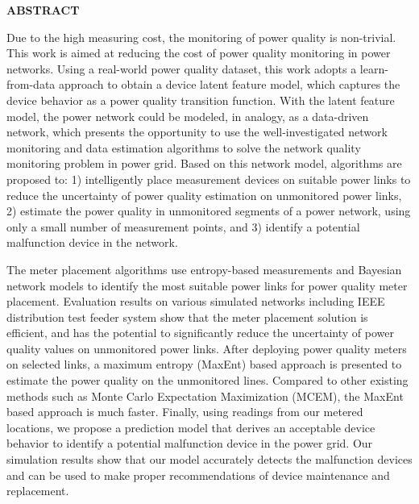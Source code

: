 \newpage
{}


\begin{center}
\textbf{ABSTRACT}
\end{center}

Due to the high measuring cost, the monitoring of power quality is non-trivial. This work is aimed at reducing the cost of power quality monitoring in power networks. Using a real-world power quality dataset, this work adopts a learn-from-data approach to obtain a device latent feature model, which captures the device behavior as a power quality transition function. With the latent feature model, the power network could be modeled, in analogy, as a data-driven network, which presents the opportunity to use the well-investigated network monitoring and data estimation algorithms to solve the network quality monitoring problem in power grid. Based on this network model, algorithms are proposed to: 1) intelligently place measurement devices on suitable power links to reduce the uncertainty of power quality estimation on unmonitored power links, 2) estimate the power quality in unmonitored segments of a power network, using only a small number of measurement points, and 3) identify a potential malfunction device in the network.

The meter placement algorithms use entropy-based measurements and Bayesian network models to identify the most suitable power links for power quality meter placement. Evaluation results on various simulated networks including IEEE distribution test feeder system show that the meter placement solution is efficient, and has the potential to significantly reduce the uncertainty of power quality values on unmonitored power links. After deploying power quality meters on selected links, a maximum entropy (MaxEnt) based approach is presented to estimate the power quality on the unmonitored lines. Compared to other existing methods such as Monte Carlo Expectation Maximization (MCEM), the MaxEnt based approach is much faster. Finally, using readings from our metered locations, we propose a prediction model that derives an acceptable device behavior to identify a potential malfunction device in the power grid. Our simulation results show that our model accurately detects the malfunction devices and can be used to make proper recommendations of device maintenance and replacement.